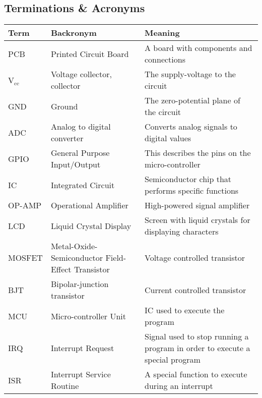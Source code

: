 
\subsection{Terminations \& Acronyms}
\label{sec:terminations}
\renewcommand{\arraystretch}{1.5}
\begin{center}
\begin{tabular}{ | m{1.5cm} | m{5cm}| m{5cm} | } 
\hline
 \textbf{Term} & \textbf{Backronym} & \textbf{Meaning} \\ 
\hline
        PCB & Printed Circuit Board & A board with components and connections \\
        \hline
        V$_{\text{cc}}$ & Voltage collector, collector & The supply-voltage to the circuit \\
        \hline
        GND & Ground & The zero-potential plane of the circuit \\
        \hline
        ADC & Analog to digital converter & Converts analog signals to digital values \\
        \hline
        GPIO & General Purpose Input/Output & This describes the pins on the micro-controller \\
        \hline
        IC & Integrated Circuit & Semiconductor chip that performs specific functions \\
        \hline
        OP-AMP & Operational Amplifier & High-powered signal amplifier \\
        \hline
        LCD & Liquid Crystal Display & Screen with liquid crystals for displaying characters \\
        \hline
        MOSFET & Metal-Oxide-Semiconductor Field-Effect Transistor & Voltage controlled transistor \\
        \hline
        BJT & Bipolar-junction transistor & Current controlled transistor \\
        \hline
        MCU & Micro-controller Unit & IC used to execute the program \\
        \hline
        IRQ & Interrupt Request & Signal used to stop running a program in order to execute a special program \\
        \hline
        ISR & Interrupt Service Routine & A special function to execute during an interrupt \\
        \hline
\end{tabular}
\end{center}